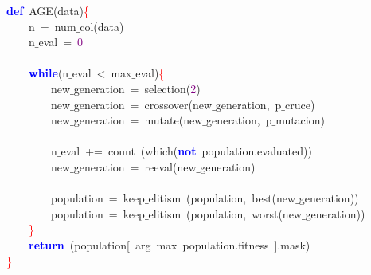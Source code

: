 \noindent
\mbox{}\textbf{\textcolor{Blue}{def}}\ AGE\textcolor{BrickRed}{(}data\textcolor{BrickRed}{)}\textcolor{Red}{\{} \\
\mbox{}\ \ \ \ n\ \textcolor{BrickRed}{=}\ num$\_$col\textcolor{BrickRed}{(}data\textcolor{BrickRed}{)} \\
\mbox{}\ \ \ \ n$\_$eval\ \textcolor{BrickRed}{=}\ \textcolor{Purple}{0} \\
\mbox{} \\
\mbox{}\ \ \ \ \textbf{\textcolor{Blue}{while}}\textcolor{BrickRed}{(}n$\_$eval\ \textcolor{BrickRed}{\textless{}}\ max$\_$eval\textcolor{BrickRed}{)}\textcolor{Red}{\{} \\
\mbox{}\ \ \ \ \ \ \ \ new$\_$generation\ \textcolor{BrickRed}{=}\ selection\textcolor{BrickRed}{(}\textcolor{Purple}{2}\textcolor{BrickRed}{)} \\
\mbox{}\ \ \ \ \ \ \ \ new$\_$generation\ \textcolor{BrickRed}{=}\ crossover\textcolor{BrickRed}{(}new$\_$generation\textcolor{BrickRed}{,}\ p$\_$cruce\textcolor{BrickRed}{)} \\
\mbox{}\ \ \ \ \ \ \ \ new$\_$generation\ \textcolor{BrickRed}{=}\ mutate\textcolor{BrickRed}{(}new$\_$generation\textcolor{BrickRed}{,}\ p$\_$mutacion\textcolor{BrickRed}{)} \\
\mbox{} \\
\mbox{}\ \ \ \ \ \ \ \ n$\_$eval\ \textcolor{BrickRed}{+=}\ count\ \textcolor{BrickRed}{(}which\textcolor{BrickRed}{(}\textbf{\textcolor{Blue}{not}}\ population\textcolor{BrickRed}{.}evaluated\textcolor{BrickRed}{))} \\
\mbox{}\ \ \ \ \ \ \ \ new$\_$generation\ \textcolor{BrickRed}{=}\ reeval\textcolor{BrickRed}{(}new$\_$generation\textcolor{BrickRed}{)} \\
\mbox{} \\
\mbox{}\ \ \ \ \ \ \ \ population\ \textcolor{BrickRed}{=}\ keep$\_$elitism\ \textcolor{BrickRed}{(}population\textcolor{BrickRed}{,}\ best\textcolor{BrickRed}{(}new$\_$generation\textcolor{BrickRed}{))} \\
\mbox{}\ \ \ \ \ \ \ \ population\ \textcolor{BrickRed}{=}\ keep$\_$elitism\ \textcolor{BrickRed}{(}population\textcolor{BrickRed}{,}\ worst\textcolor{BrickRed}{(}new$\_$generation\textcolor{BrickRed}{))} \\
\mbox{}\ \ \ \ \textcolor{Red}{\}} \\
\mbox{}\ \ \ \ \textbf{\textcolor{Blue}{return}}\ \textcolor{BrickRed}{(}population\textcolor{BrickRed}{[}\ arg\ max\ population\textcolor{BrickRed}{.}fitness\ \textcolor{BrickRed}{].}mask\textcolor{BrickRed}{)} \\
\mbox{}\textcolor{Red}{\}} \\
\mbox{}
